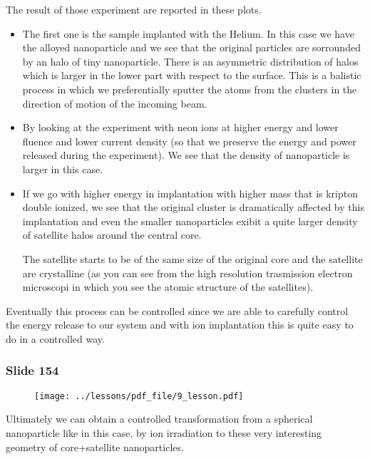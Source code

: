 \documentclass[../main/main.tex]{subfiles}
\begin{document}
The result of those experiment are reported in these plots.

\begin{itemize}
\item The first one is the sample implanted with the Helium. In this case we have the alloyed nanoparticle and we see that the original particles are sorrounded by an halo of tiny nanoparticle. There is an asymmetric distribution of halos which is larger in the lower part with respect to the surface. This is a balistic process in which we preferentially sputter the atoms from the clusters in the direction of motion of the incoming beam.

\item By looking at the experiment with neon ions at higher energy and lower fluence and lower current density (so that we preserve the energy and power released during the experiment). We see that the density of nanoparticle is larger in this case.

\item If we go with higher energy in implantation with higher mass that is kripton double ionized, we see that the original cluster is dramatically affected by this implantation and even the smaller nanoparticles exibit a quite larger density of satellite halos around the central core.

The satellite starts to be of the same size of the original core and the satellite are crystalline (as you can see from the high resolution trasmission electron microscopi in which you see the atomic structure of the satellites).

\end{itemize}

Eventually this process can be controlled since we are able to carefully control the energy release to our system and with ion implantation this is quite easy to do in a controlled way.

\newpage

\subsubsection{Slide 154}

\begin{figure}[h!]
\centering
\texttt{[image: ../lessons/pdf\_file/9\_lesson.pdf]}
\end{figure}

Ultimately we can obtain a controlled transformation from a spherical nanoparticle like in this case, by ion irradiation to these very interesting geometry of core+satellite nanoparticles.
\end{document}
